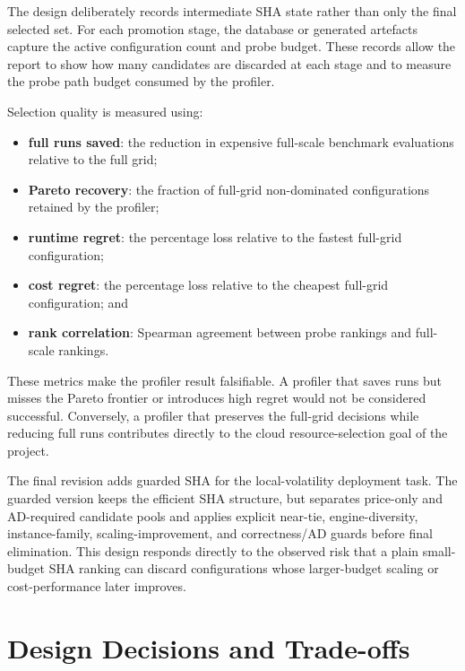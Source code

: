 The design deliberately records intermediate SHA state rather than only the
final selected set. For each promotion stage, the database or generated
artefacts capture the active configuration count and probe budget. These records
allow the report to show how many candidates are discarded at each stage and to
measure the probe path budget consumed by the profiler.

Selection quality is measured using:
\begin{itemize}
    \item \textbf{full runs saved}: the reduction in expensive full-scale
          benchmark evaluations relative to the full grid;
    \item \textbf{Pareto recovery}: the fraction of full-grid non-dominated
          configurations retained by the profiler;
    \item \textbf{runtime regret}: the percentage loss relative to the fastest
          full-grid configuration;
    \item \textbf{cost regret}: the percentage loss relative to the cheapest
          full-grid configuration; and
    \item \textbf{rank correlation}: Spearman agreement between probe rankings
          and full-scale rankings.
\end{itemize}

These metrics make the profiler result falsifiable. A profiler that saves runs
but misses the Pareto frontier or introduces high regret would not be considered
successful. Conversely, a profiler that preserves the full-grid decisions while
reducing full runs contributes directly to the cloud resource-selection goal of
the project.

The final revision adds guarded SHA for the local-volatility deployment task.
The guarded version keeps the efficient SHA structure, but separates price-only
and AD-required candidate pools and applies explicit near-tie, engine-diversity,
instance-family, scaling-improvement, and correctness/AD guards before final
elimination. This design responds directly to the observed risk that a plain
small-budget SHA ranking can discard configurations whose larger-budget scaling
or cost-performance later improves.

\section{Design Decisions and Trade-offs}
\label{sec:design-decisions}

